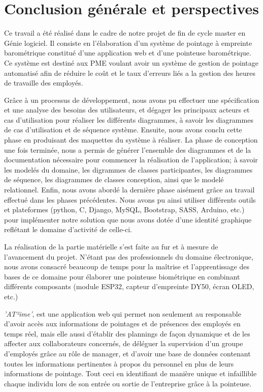 \chapter*{Conclusion générale et perspectives}

Ce travail a été réalisé dans le cadre de notre projet de fin de cycle master en
Génie logiciel. Il consiste en l'élaboration d'un système de pointage à
empreinte barométrique constitué d'une application web et d'une pointeuse
barométrique. Ce système est destiné aux PME voulant avoir un système de gestion
de pointage automatisé afin de réduire le coût et le taux d'erreurs liés a la
gestion des heures de travaille des employés.

Grâce à un processus de développement, nous avons pu effectuer une spécification
et une analyse des besoins des utilisateurs, et dégager les principaux
acteurs et cas d'utilisation pour réaliser les différents diagrammes, à savoir
les diagrammes de cas d'utilisation et de séquence système. Ensuite, nous avons
conclu cette phase en produisant des maquettes du système à réaliser. La phase
de conception une fois terminée, nous a permis de générer l'ensemble des
diagrammes et de la documentation nécessaire pour commencer la réalisation de
l'application; à savoir les modelés du domaine,  les digrammes de classes
participantes, les diagrammes de séquence, les diagrammes de classes conception,
ainsi que le modelé relationnel. Enfin, nous avons abordé la dernière phase
aisément grâce au travail effectué dans les phases précédentes. Nous avons pu
ainsi utiliser différents outils et plateformes (python, C, Django, MySQL,
Bootstrap, SASS, Arduino, etc.) pour implémenter notre solution que nous avons
dotée d'une identité graphique reflétant le domaine d'activité de celle-ci.

La réalisation de la partie matérielle s'est faite au fur et à mesure de
l'avancement du projet. N’étant pas des professionnels du domaine électronique,
nous avons consacré beaucoup de temps pour la maîtrise et l'apprentissage des
bases de ce domaine pour élaborer une pointeuse biométrique en combinant
différents composants (module ESP32, capteur d'empreinte DY50, écran OLED, etc.)   

\emph{'AT²ime'}, est une application web qui permet non seulement au responsable
d'avoir accès aux informations de pointages et de présences des employés en temps
réel, mais elle aussi d'établir des plannings de façon dynamique et de
les affecter aux collaborateurs concernés, de déléguer la supervision d'un
groupe d'employés grâce au rôle de manager, et d'avoir une base de données
contenant toutes les informations pertinentes à propos du personnel en plus de
leurs informations de pointage. Tout ceci en identifiant de manière
unique et infaillible chaque individu lors de son entrée ou sortie de
l'entreprise grâce à la pointeuse.   

